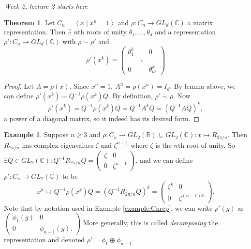 \documentclass[a4paper]{article}
\newcommand{\la}{\left\langle}
\newcommand{\ra}{\right\rangle}
\newcommand{\R}{\mathbb{R}}
\newcommand{\C}{\mathbb{C}}
\theoremstyle{definition}
\newtheorem{thm}[defn]{Theorem}
\newtheorem{example}[defn]{Example}
\begin{document}
\begin{flushright}
\textit{Week 2, lecture 2 starts here}
\end{flushright}

\begin{thm}
Let $C_n=\la x\mid x^n=1\ra$ and $\rho:C_n\rightarrow GL_d(\C)$ a matrix representation. Then $\exists$ $n$th roots of unity $\theta_1,\ldots,\theta_d$ and a representation $\rho':C_n\rightarrow GL_d(\C)$ with $\rho\sim\rho'$ and
\[
\rho'(x^k)=\begin{pmatrix}
\theta_1^k & & 0 \\ & \ddots \\ 0&&\theta_d^k.
\end{pmatrix}
\]
\end{thm}
\begin{proof}
Let $A=\rho(x)$. Since $x^n=1,\ A^n=\rho(x^n)=I_d$. By lemma above, we can define $\rho'(x^k)=Q^{-1}\rho(x^k)Q$. By definition, $\rho'\sim\rho$. Now
\[
\rho'(x^k)=Q^{-1}\rho(x^k)Q=Q^{-1}A^kQ=(Q^{-1}AQ)^k,
\]
a power of a diagonal matrix, so it indeed has its desired form.
\end{proof}

\begin{example}
Suppose $n\geq 3$ and $\rho:C_n\rightarrow GL_2(\R)\subseteq GL_2(\C):x\mapsto R_{2\pi/n}$. Then $R_{2\pi/n}$ has complex eigenvalues $\zeta$ and $\zeta^{n-1}$ where $\zeta$ is the $n$th root of unity. So $\exists Q\in GL_2(\C):Q^{-1}R_{2\pi/n}Q=\begin{pmatrix}
\zeta & 0 \\ 0 & \zeta^{n-1}
\end{pmatrix}$, and we can define $\rho':C_n\rightarrow GL_2(\C)$ to be
\[
x^k\mapsto Q^{-1}\rho(x^k) Q=(Q^{-1}R_{2\pi/n}Q)^k=\begin{pmatrix}
\zeta^k & 0 \\ 0 & \zeta^{(n-1)k}
\end{pmatrix}.
\]
Note that by notation used in Example \ref{example:Cnrep}, we can write $\rho'(g)$ as $\begin{pmatrix}
\phi_1(g) & 0 \\ 0 & \phi_{n-1}(g).
\end{pmatrix}$ More generally, this is called \textit{decomposing} the representation and denoted $\rho'=\phi_1\oplus\phi_{n-1}$.
\end{example}
\end{document}
